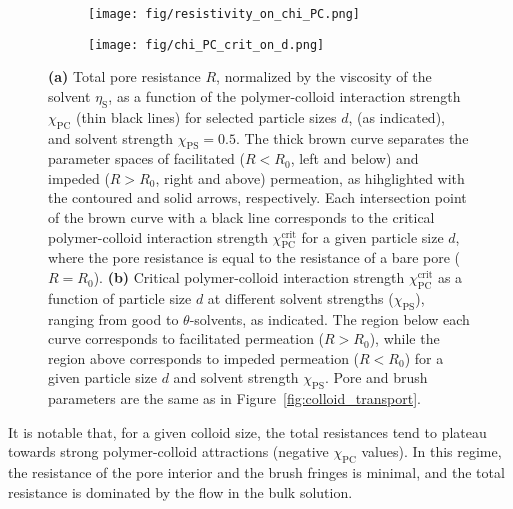 \documentclass[12pt, a4paper]{article}
\begin{document}
\begin{figure}
    \centering
    \begin{subfigure}[b]{0.4\textwidth}
        \texttt{[image: fig/resistivity\_on\_chi\_PC.png]}
    \end{subfigure}
    \hspace{0.03\textwidth}
    \begin{subfigure}[b]{0.52\textwidth}
        \texttt{[image: fig/chi\_PC\_crit\_on\_d.png]}
    \end{subfigure}%
    \caption{
        \textbf{(a)} Total pore resistance $R$, normalized by the viscosity of the solvent $\eta_\text{S}$, as a function of the polymer-colloid interaction strength $\chi_{\text{PC}}$ (thin black lines) for selected particle sizes $d $, (as indicated), and solvent strength $\chi_{\text{PS}}=0.5$.
        The thick brown curve separates the parameter spaces of facilitated ($R < R_{0}$, left and below) and impeded ($R > R_{0}$, right and above) permeation, as hihglighted with the contoured and solid arrows, respectively.
        Each intersection point of the brown curve with a black line corresponds to the critical polymer-colloid interaction strength $\chi_{\text{PC}}^{\text{crit}}$ for a given particle size $d$, where the pore resistance is equal to the resistance of a bare pore ($R = R_{0}$).
        \textbf{(b)} Critical polymer-colloid interaction strength $\chi_{\text{PC}}^{\text{crit}}$ as a function of particle size $d$ at different solvent strengths ($\chi_{\text{PS}}$), ranging from good to $\theta$-solvents, as indicated.
        The region below each curve corresponds to facilitated permeation ($R > R_{0}$), while the region above corresponds to impeded permeation ($R < R_{0}$) for a given particle size $d$ and solvent strength $\chi_{\text{PS}}$.
        Pore and brush parameters are the same as in Figure~\ref{fig:colloid_transport}.
    }
    \label{fig:R_vs_chi_PC}
\end{figure}

It is notable that, for a given colloid size, the total resistances tend to plateau towards strong polymer-colloid attractions (negative $\chi_{\text{PC}}$ values).
In this regime, the resistance of the pore interior and the brush fringes is minimal, and the total resistance is dominated by the flow in the bulk solution.
\end{document}
